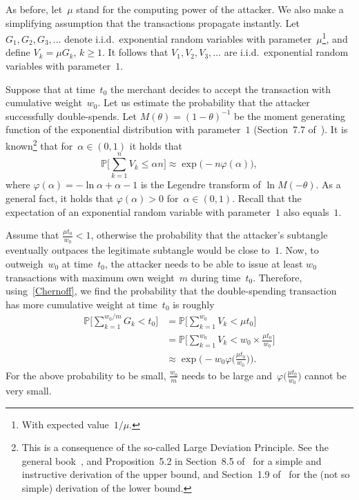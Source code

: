 \documentclass[12pt]{article}
\newcommand{\IP}{\mathbb{P}}
\let\phi=\varphi
\begin{document}
\begin{CJK}{UTF8}{bkai}
As before, let~$\mu$ stand for the computing power of the attacker.
We also make a simplifying assumption that the 
transactions propagate instantly.
Let $G_1,G_2, G_3,\ldots$ denote i.i.d.\ exponential 
random variables with parameter~$\mu$\footnote{With expected
 value~$1/\mu$.}, and define
$V_k=\mu G_k$, $k\geq 1$. It follows that
$V_1,V_2, V_3,\ldots$ are i.i.d.\ exponential 
random variables with parameter~$1$. 

Suppose that at time~$t_0$ the merchant decides to accept
the transaction with cumulative weight~$w_0$.
Let us estimate the probability that the attacker
successfully double-spends. Let $M(\theta)=(1-\theta)^{-1}$
be the moment generating function of the exponential
distribution with parameter~$1$ (Section~7.7
of~\cite{Ross}). 
It is known\footnote{This is a consequence of the so-called
Large Deviation Principle.
See the general book~\cite{DZ}, and
 Proposition~5.2 in Section~8.5 of~\cite{Ross}
for a simple and instructive derivation of the 
upper bound, and Section~1.9 of~\cite{Dur} for the 
(not so simple) derivation of the lower bound.} that for~$\alpha\in (0,1)$ it holds that
\begin{equation}
\label{Chernoff}
 \IP\Big[\sum_{k=1}^n V_k \leq \alpha n\Big] \approx
   \exp\big(-n\phi(\alpha)\big), 
\end{equation}
where $\phi(\alpha)=-\ln \alpha + \alpha -1$ is the Legendre
transform of $\ln M(-\theta)$. 
As a general fact,
it holds that $\phi(\alpha)>0$ for~$\alpha\in (0,1)$. Recall
that the expectation of an exponential random variable 
with parameter~$1$ also equals~$1$.

Assume that $\frac{\mu t_0}{w_0}<1$, otherwise the probability
that the attacker's subtangle
eventually outpaces the legitimate subtangle would be close to~$1$.
Now, to outweigh~$w_0$ at time~$t_0$, the attacker needs
to be able to issue at least $w_0$ 
transactions with maximum own weight~$m$
during time~$t_0$. 
Therefore, using~\eqref{Chernoff}, we find
 the probability that the double-spending transaction
has more cumulative weight at time~$t_0$
is roughly
\begin{align}
 \IP\Big[\sum_{k=1}^{w_0/m} G_k  < t_0\Big]
 & = \IP\Big[\sum_{k=1}^{w_0} V_k  < \mu t_0\Big]
\nonumber\\
& = \IP\Big[\sum_{k=1}^{w_0} V_k  < w_0
\times\frac{\mu t_0}{w_0}\Big]
\nonumber\\
 & \approx \exp\big(-w_0
\phi\big(\textstyle\frac{\mu t_0}{w_0}\big)\big).
\label{double_t0}
\end{align}
For the above probability to be small,
$\frac{w_0}{m}$ needs to be large 
and~$\phi\big(\textstyle\frac{\mu t_0}{w_0}\big)$
cannot be very small. 


\end{CJK}
\end{document}
